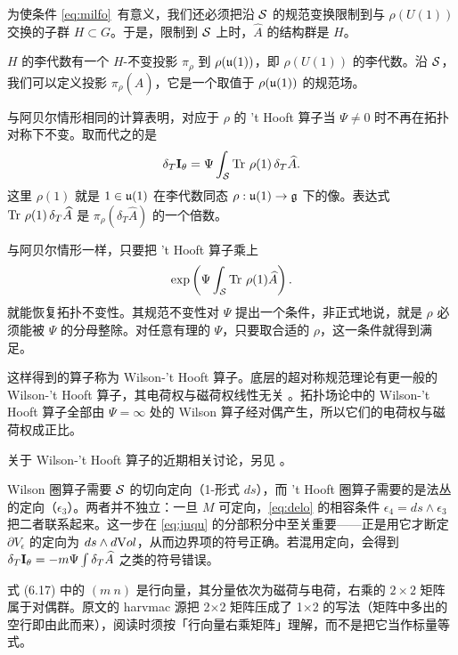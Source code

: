 为使条件 \eqref{eq:milfo}\ 有意义，我们还必须把沿 ${{\cal S}}$ 的规范变换限制到与 $\rho(U(1))$ 交换的子群 $H\subset G$。于是，限制到 ${{\cal S}}$ 上时，$\hat A$ 的结构群是 $H$。

$H$ 的李代数有一个 $H$-不变投影 $\pi_\rho$ 到 $\rho(\frak{u}(1))$，即 $\rho(U(1))$ 的李代数。沿 ${{\cal S}}$，我们可以定义投影 $\pi_\rho(\hat A)$，它是一个取值于 $\rho(\frak{u}(1))$ 的规范场。

与阿贝尔情形相同的计算表明，对应于 $\rho$ 的 't Hooft 算子当 $\Psi\not= 0$ 时不再在拓扑对称下不变。取而代之的是
\setcounter{equation}{18}
\begin{equation}\label{eq:yugo}
\delta_T {{\cmmib I}}_\theta={\Psi}\int_{{\cal S}}
\Tr\,\rho(1)\,\delta_T\hat A.
\end{equation}
 这里 $\rho(1)$ 就是 $1\in \frak u(1)$ 在李代数同态 $\rho:\frak u(1)\to \frak g$ 下的像。表达式 $\Tr\,\rho(1)\,\delta_T \hat A$ 是 $\pi_\rho(\delta_T\hat A)$ 的一个倍数。

与阿贝尔情形一样，只要把 't Hooft 算子乘上
\setcounter{equation}{19}
\begin{equation}\label{eq:yrot}
\exp\left(\Psi\int_{{\cal S}} \Tr \,\rho(1)\hat A\right).
\end{equation}
 就能恢复拓扑不变性。其规范不变性对 $\Psi$ 提出一个条件，非正式地说，就是 $\rho$ 必须能被 $\Psi$ 的分母整除。对任意有理的 $\Psi$，只要取合适的 $\rho$，这一条件就得到满足。

这样得到的算子称为 Wilson-'t Hooft 算子。底层的超对称规范理论有更一般的 Wilson-'t Hooft 算子，其电荷权与磁荷权线性无关 \cite{ref90}。拓扑场论中的 Wilson-'t Hooft 算子全部由 $\Psi=\infty$ 处的 Wilson 算子经对偶产生，所以它们的电荷权与磁荷权成正比。

关于 Wilson-'t Hooft 算子的近期相关讨论，另见 \cite{ref92}。

\begin{yizhu}[易错点]
Wilson 圈算子需要 ${\cal S}$ 的切向定向（1-形式 $ds$），而 't Hooft 圈算子需要的是法丛的定向（$\epsilon_3$）。两者并不独立：一旦 $M$ 可定向，\eqref{eq:delo} 的相容条件 $\epsilon_4=ds\wedge\epsilon_3$ 把二者联系起来。这一步在 \eqref{eq:juqu} 的分部积分中至关重要——正是用它才断定 $\partial V_\epsilon$ 的定向为 $ds\wedge d{\rm Vol}$，从而边界项的符号正确。若混用定向，会得到 $\delta_T{{\cmmib I}}_\theta=-m\Psi\int\delta_T\hat A$ 之类的符号错误。
\end{yizhu}

\begin{yizhu}[易错点]
式 (6.17) 中的 $(m\ n)$ 是行向量，其分量依次为磁荷与电荷，右乘的 $2\times 2$ 矩阵属于对偶群。原文的 harvmac 源把 2$\times$2 矩阵压成了 1$\times$2 的写法（矩阵中多出的空行即由此而来），阅读时须按「行向量右乘矩阵」理解，而不是把它当作标量等式。
\end{yizhu}

